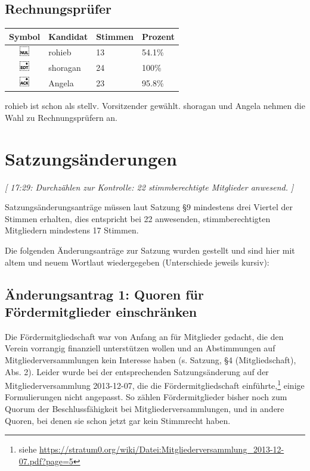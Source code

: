 \documentclass[a4paper,12pt]{scrartcl}
\begin{document}
\subsection*{Rechnungsprüfer}
\begin{tabular}{|c|l|l|l|}
  \hline
  \textbf{Symbol} & \textbf{Kandidat} & \textbf{Stimmen} & \textbf{Prozent} \\
  \hline
  \includegraphics[height=12pt]{images/mv20151206-wahl-rechnungspruefer-1.pdf} &
  rohieb   & 13 & 54.1\% \\
  \includegraphics[height=12pt]{images/mv20151206-wahl-rechnungspruefer-2.pdf} &
  shoragan & 24 & 100\%  \\
  \includegraphics[height=12pt]{images/mv20151206-wahl-rechnungspruefer-3.pdf} &
  Angela   & 23 & 95.8\% \\
  \hline
\end{tabular}

rohieb ist schon als stellv. Vorsitzender gewählt. shoragan und Angela nehmen
die Wahl zu Rechnungsprüfern an.


\section{Satzungsänderungen}
\emph{[ 17:29: Durchzählen zur Kontrolle: 22 stimmberechtigte Mitglieder
anwesend. ]}

Satzungsänderungsanträge müssen laut Satzung §9 mindestens drei Viertel der
Stimmen erhalten, dies entspricht bei 22 anwesenden, stimmberechtigten
Mitgliedern mindestens 17 Stimmen.

Die folgenden Änderungsanträge zur Satzung wurden gestellt und sind hier
mit altem und neuem Wortlaut wiedergegeben (Unterschiede jeweils
kursiv):

\subsection{Änderungsantrag 1: Quoren für Fördermitglieder einschränken}
Die Fördermitgliedschaft war von Anfang an für Mitglieder gedacht, die den
Verein vorrangig finanziell unterstützen wollen und an Abstimmungen auf
Mitgliederversammlungen kein Interesse haben (s. Satzung, §4 (Mitgliedschaft),
Abs. 2). Leider wurde bei der entsprechenden Satzungsänderung auf der
Mitgliederversammlung 2013-12-07, die die Fördermitgliedschaft
einführte,\footnote{siehe \url{
https://stratum0.org/wiki/Datei:Mitgliederversammlung_2013-12-07.pdf?page=5}}
einige Formulierungen nicht angepasst. So zählen Fördermitglieder bisher noch
zum Quorum der Beschlussfähigkeit bei Mitgliederversammlungen, und in andere
Quoren, bei denen sie schon jetzt gar kein Stimmrecht haben.
\end{document}
